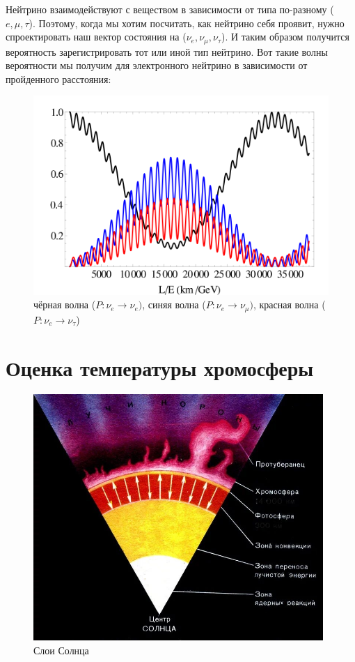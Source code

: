 \documentclass[a4paper,12pt]{article}
\begin{document}
Нейтрино взаимодействуют с веществом в зависимости от типа по-разному ($e, \mu, \tau$). Поэтому, когда мы хотим посчитать, как нейтрино себя проявит, нужно спроектировать наш вектор состояния на ($\nu_e, \nu_\mu, \nu_\tau$). И таким образом получится вероятность зарегистрировать тот или иной тип нейтрино. Вот такие волны вероятности мы получим для электронного нейтрино в зависимости от пройденного расстояния:

\begin{figure}[H]
		\centering
		\includegraphics[width=170mm]{Images/Oscillations_electron_long.png}
        \caption{чёрная волна ($P: \nu_e \rightarrow \nu_e)$, синяя волна ($P: \nu_e \rightarrow \nu_{\mu})$, красная волна ($P: \nu_e \rightarrow \nu_{\tau}$)}
\end{figure}


\newpage
\section*{Оценка температуры хромосферы}

\begin{figure}[H]
		\centering
		\includegraphics[width=110mm]{Images/Sun_layers.jpeg}
        \caption{Слои Солнца}
\end{figure}
\end{document}
